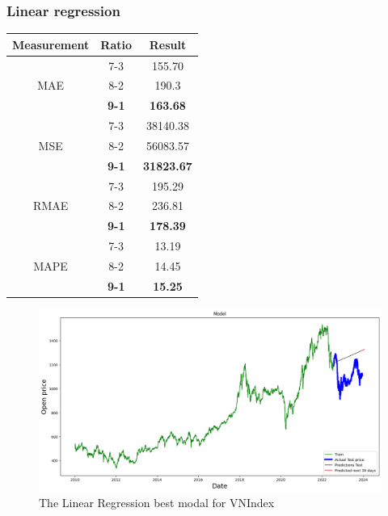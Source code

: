\documentclass{ieeeojies}
\begin{document}
\subsubsection{Linear regression}
\begin{table}[H]
    \centering
    \begin{tabular}{|c|c|c|}
        \hline
         Measurement & Ratio &  Result  \\
        \hline
             & 7-3 & 155.70 \\
        MAE  & 8-2 & 190.3  \\
            & \textbf{9-1} & \textbf{163.68 }\\
        \hline
           & 7-3 & 38140.38  \\
        MSE  & 8-2 & 56083.57 \\
            & \textbf{9-1} & \textbf{31823.67 } \\
        \hline
           & 7-3 & 195.29 \\
        RMAE  & 8-2 & 236.81  \\
            & \textbf{9-1} & \textbf{178.39} \\
        \hline
           & 7-3 & 13.19  \\
        MAPE  & 8-2 & 14.45  \\
            & \textbf{9-1} & \textbf{15.25} \\
        \hline
    \end{tabular}
    \label{table:example}
\end{table}
\begin{figure}[H]
    \centering
    \includegraphics[width=0.8\linewidth]{RE VN DEX 91.jpg}
    \caption{The Linear Regression best modal for VNIndex}
    \label{fig:example}
\end{figure}
\end{document}
